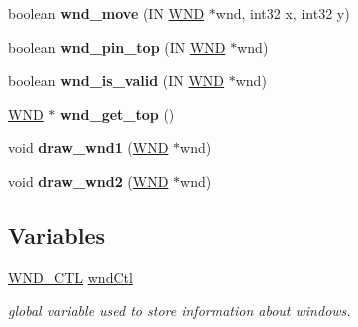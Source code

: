 \begin{DoxyCompactItemize}
\item 
\hypertarget{group__windows_ga2a1d4255c0ff0558f22c9d7f2d37817b}{}boolean {\bfseries wnd\+\_\+move} (I\+N \hyperlink{struct_w_n_d}{W\+N\+D} $\ast$wnd, int32 x, int32 y)\label{group__windows_ga2a1d4255c0ff0558f22c9d7f2d37817b}

\item 
\hypertarget{group__windows_ga6547c15d0ede386646d9938ebe27e862}{}boolean {\bfseries wnd\+\_\+pin\+\_\+top} (I\+N \hyperlink{struct_w_n_d}{W\+N\+D} $\ast$wnd)\label{group__windows_ga6547c15d0ede386646d9938ebe27e862}

\item 
\hypertarget{group__windows_gac4500916fe29250879217cda26f8c3ab}{}boolean {\bfseries wnd\+\_\+is\+\_\+valid} (I\+N \hyperlink{struct_w_n_d}{W\+N\+D} $\ast$wnd)\label{group__windows_gac4500916fe29250879217cda26f8c3ab}

\item 
\hypertarget{group__windows_gaed74b818c006388888e95ee0a5c33efc}{}\hyperlink{struct_w_n_d}{W\+N\+D} $\ast$ {\bfseries wnd\+\_\+get\+\_\+top} ()\label{group__windows_gaed74b818c006388888e95ee0a5c33efc}

\item 
\hypertarget{group__windows_ga2bcbb122f1267b120d4910b658169db5}{}void {\bfseries draw\+\_\+wnd1} (\hyperlink{struct_w_n_d}{W\+N\+D} $\ast$wnd)\label{group__windows_ga2bcbb122f1267b120d4910b658169db5}

\item 
\hypertarget{group__windows_gae309fc2e8fcd8eab4ae2c1966a994119}{}void {\bfseries draw\+\_\+wnd2} (\hyperlink{struct_w_n_d}{W\+N\+D} $\ast$wnd)\label{group__windows_gae309fc2e8fcd8eab4ae2c1966a994119}

\end{DoxyCompactItemize}
\subsection*{Variables}
\begin{DoxyCompactItemize}
\item 
\hyperlink{struct_w_n_d___c_t_l}{W\+N\+D\+\_\+\+C\+T\+L} \hyperlink{group__windows_ga09cb97df9687e1ed6c1d124cb94ed6d5}{wnd\+Ctl}
\begin{DoxyCompactList}\small\item\em global variable used to store information about windows. \end{DoxyCompactList}\end{DoxyCompactItemize}


